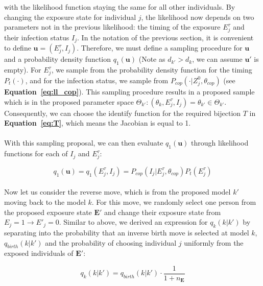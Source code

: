 with the likelihood function staying the same for all other individuals. By changing the exposure state for individual $j$, the likelihood now depends on two parameters not in the previous likelihood: the timing of the exposure $E^\tau_j$ and their infection status $I_j$. In the notation of the previous section, it is convenient to define $\mathbf{u} = (E^\tau_j, I_j)$. Therefore, we must define a sampling procedure for $\mathbf{u}$ and a probability density function $q_1(\mathbf{u})$ (Note as $d_{k'} > d_k$, we can assume $\mathbf{u'}$ is empty).  For $E^\tau_j$, we sample from the probability density function for the timing $P_t(\cdot)$, and for the infection status, we sample from $P_{cop}(\cdot | Z_j^0, \theta_{cop})$ (see \textbf{Equation~\ref{eq:ll_cop}}). This sampling procedure results in a proposed sample which is in the proposed parameter space $\Theta_{k'}: (\theta_k, E^\tau_j, I_j) = \theta_{k'} \in \Theta_{k'}$. Consequently, we can choose the identify function for the required bijection $T$ in \textbf{Equation~\ref{eq:T}}, which means the Jacobian is equal to 1.

\paragraph{}With this sampling proposal, we can then evaluate $q_1(\mathbf{u})$ through likelihood functions for each of $I_j$ and $E^\tau_j$:

\begin{equation}
q_1(\mathbf{u}) = q_1(E^\tau_j, I_j) = P_{cop}(I_j | E_j^\tau, \theta_{cop})P_t(E^\tau_j)
\end{equation}

\paragraph{}Now let us consider the reverse move, which is from the proposed model $k'$ moving back to the model $k$. For this move, we randomly select one person from the proposed exposure state $\mathbf{E'}$ and change their exposure state from $E_j = 1 \rightarrow E'_j = 0$. Similar to above, we derived an expression for $q_k(k | k')$ by separating into the probability that an inverse birth move is selected at model $k$, $q_{birth}(k |k')$ and the probability of choosing individual $j$ uniformly from the exposed individuals of $\mathbf{E}'$:

\begin{equation}
q_k(k | k') = q_{birth}(k |k')\cdot \frac{1}{1 + n_{\mathbf{E}}}
\end{equation}


